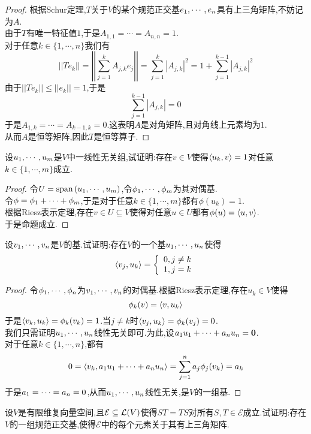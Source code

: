 \documentclass{ctexart}
\begin{document}
\begin{proof}
    根据Schur定理,$T$关于$V$的某个规范正交基${e}_1,\cdots,{e}_{n}$具有上三角矩阵,不妨记为$A$.\\
    由于$T$有唯一特征值$1$,于是$A_{1,1}=\cdots=A_{n,n}=1$.\\
    对于任意$k\in\{1,\cdots,n\}$我们有
    \[||Te_k||
    =\left|\left|\sum_{j=1}^{k}A_{j,k}e_j\right|\right|
    =\sum_{j=1}^{k}\left|A_{j,k}\right|^2
    =1+\sum_{j=1}^{k-1}\left|A_{j,k}\right|^2\]
    由于$||Te_k||\leqslant||e_k||=1$,于是
    \[\sum_{j=1}^{k-1}\left|A_{j,k}\right|=0\]
    于是$A_{1,k}=\cdots=A_{k-1,k}=0$.这表明$A$是对角矩阵,且对角线上元素均为$1$.\\
    从而$A$是恒等矩阵,因此$T$是恒等算子.
\end{proof}
\begin{problem}[18.]
    设${u}_1,\cdots,{u}_{m}$是$V$中一线性无关组,试证明:存在$v\in V$使得$\left\langle{u_k},{v}\right\rangle=1$对任意$k\in\{1,\cdots,m\}$成立.
\end{problem}
\begin{proof}
    令$U=\text{span}\left({u}_1,\cdots,{u}_{m}\right)$,令${\phi}_1,\cdots,{\phi}_{m}$为其对偶基.\\
    令$\phi={\phi}_1+\cdots+{\phi}_{m}$,于是对于任意$k\in\{1,\cdots,m\}$都有$\phi\left(u_k\right)=1$.\\
    根据Riesz表示定理,存在$v\in U\subseteq V$使得对任意$u\in U$都有$\phi(u)=\left\langle{u},{v}\right\rangle$.\\
    于是命题成立.
\end{proof}
\begin{problem}[19.]
    设${v}_1,\cdots,{v}_{n}$是$V$的基.试证明:存在$V$的一个基${u}_1,\cdots,{u}_{n}$使得
    \[\left\langle{v_j},{u_k}\right\rangle=\left\{\begin{array}{l}
        0,j\neq k\\
        1,j=k
    \end{array}\right.\]
\end{problem}
\begin{proof}
    令${\phi}_1,\cdots,{\phi}_{n}$为${v}_1,\cdots,{v}_{n}$的对偶基.根据Riesz表示定理,存在$u_k\in V$使得
    \[\phi_k(v)=\left\langle{v},{u_k}\right\rangle\]
    于是$\left\langle{v_k},{u_k}\right\rangle=\phi_k(v_k)=1$.当$j\neq k$时$\left\langle{v_j},{u_k}\right\rangle=\phi_k(v_j)=0$.\\
    我们只需证明${u}_1,\cdots,{u}_{n}$线性无关即可.为此,设$a_1u_1+\cdots+a_nu_n=\mathbf0$.\\
    对于任意$k\in\{1,\cdots,n\}$,都有
    \[0=\left\langle{v_k},{a_1u_1+\cdots+a_nu_n}\right\rangle=\sum_{j=1}^{n}a_j\phi_j(v_k)=a_k\]
    于是${a}_1=\cdots={a}_{n}=0$,从而${u}_1,\cdots,{u}_{n}$线性无关,是$V$的一组基.
\end{proof}
\begin{problem}[20.]
    设$V$是有限维复向量空间,且$\mathcal{E}\subseteq\mathcal{L}(V)$使得$ST=TS$对所有$S,T\in\mathcal{E}$成立.试证明:存在$V$的一组规范正交基,使得$\mathcal{E}$中的每个元素关于其有上三角矩阵.
\end{problem}
\end{document}
